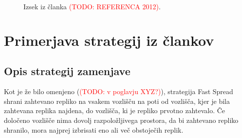 \documentclass[a4paper, 12pt]{book}
\newcommand{\TODO}[1]{\textcolor{red}{(TODO: #1)}}
\begin{document}
\begin{figure}
  \begin{center}
  \end{center}
  \caption{Izsek iz članka \TODO{REFERENCA 2012}.}
  \label{pic2012}
\end{figure}



\chapter{Primerjava strategij iz člankov}

\section{Opis strategij zamenjave}
Kot je že bilo omenjeno (\TODO{v poglavju XYZ?}), strategija Fast Spread
shrani zahtevano repliko na vsakem vozlišču na poti od vozlišča, kjer je
bila zahtevana replika najdena, do vozlišča, ki je repliko prvotno
zahtevalo. Če določeno vozlišče nima dovolj razpoložljivega prostora,
da bi zahtevano repliko shranilo, mora najprej izbrisati eno ali več
obstoječih replik.
\end{document}
